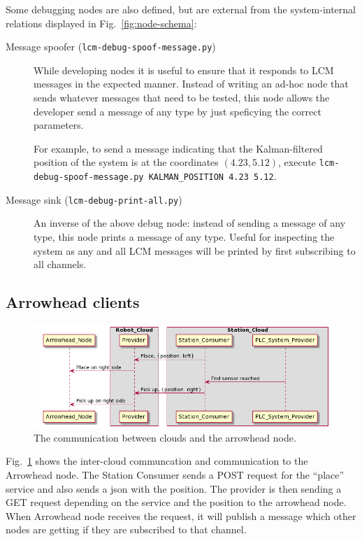 Some debugging nodes are also defined, but are external from the system-internal relations displayed in Fig.~\ref{fig:node-schema}:
\begin{description}
\item[Message spoofer (\texttt{lcm-debug-spoof-message.py})]
  While developing nodes it is useful to ensure that it responds to LCM messages in the expected manner.
  Instead of writing an ad-hoc node that sends whatever messages that need to be tested,
  this node allows the developer send a message of any type by just speficying the correct parameters.


  For example, to send a message indicating that the Kalman-filtered position of the system is at the coordinates $(4.23, 5.12)$,
  execute \texttt{lcm-debug-spoof-message.py KALMAN\_POSITION 4.23 5.12}.

\item[Message sink (\texttt{lcm-debug-print-all.py})]
  An inverse of the above debug node: instead of sending a message of any type,
  this node prints a message of any type.
  Useful for inspecting the system as any and all LCM messages will be printed by first subscribing to all channels.
\end{description}

\subsection{Arrowhead clients}

\begin{figure}[h!]
	\centering
	\includegraphics[scale=0.3]{sections/assets/arrowhead_sequence_diagram.png}
	\caption{The communication between clouds and the arrowhead node.}
	\label{fig:arrowhead_intercloud}
\end{figure}

Fig.~\ref{fig:arrowhead_intercloud} shows the inter-cloud communcation and communication to the Arrowhead node.  
The Station Consumer sends a POST request for the ``place'' service and also sends a json with the position.  
The provider is then sending a GET request depending on the service and the position to the arrowhead node.  
When Arrowhead node receives the request, it will publish a message which other nodes are getting if they are subscribed to that channel.

